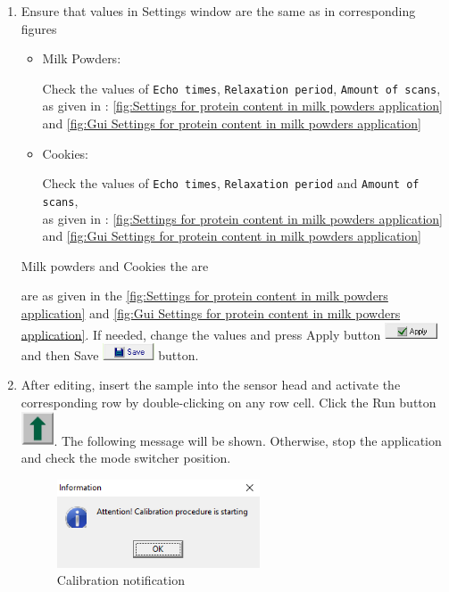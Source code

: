 \documentclass[a4paper,12pt]{article}
\begin{document}
\begin{enumerate}
\item Ensure that values in Settings window are the same as in corresponding figures 

\begin{itemize}
    \item Milk Powders:

Check the values of 
\texttt{Echo times},
\texttt{Relaxation period},
\texttt{Amount of scans},\\
as given in :
\cref{fig:Settings for protein content in milk powders application} and \cref{fig:Gui Settings for protein content in milk powders application}

    \item Cookies:
    
Check the values of 
\texttt{Echo times},
\texttt{Relaxation period} and
\texttt{Amount of scans},\\
as given in :
\cref{fig:Settings for protein content in milk powders application} and \cref{fig:Gui Settings for protein content in milk powders application}    
    
\end{itemize}
Milk powders and Cookies the  are 

are as given in the \cref{fig:Settings for protein content in milk powders application} and \cref{fig:Gui Settings for protein content in milk powders application}. If needed, change the values and press Apply button \includegraphics[height=0.5cm]{Settings_Ini_Apply.png} and then Save \includegraphics[height=0.5cm]{Settings_Ini_Save.png} button.


\item After editing, insert the sample into the sensor head and activate the corresponding row by double-clicking on any row cell. Click the Run button \includegraphics[height=1cm]{Btn_Start.jpg}.
The following message will be shown. Otherwise, stop the application and check the mode switcher position.

\begin{figure}[H]
\centering
\includegraphics[width=6cm]{Calibration_notification.png}
\caption{Calibration notification}
\label{fig:Calibration_notification}
\end{figure}


\end{enumerate}
\end{document}
